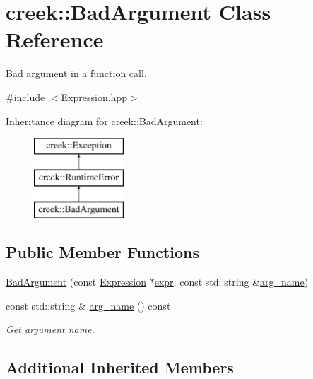 \hypertarget{classcreek_1_1_bad_argument}{}\section{creek\+:\+:Bad\+Argument Class Reference}
\label{classcreek_1_1_bad_argument}


Bad argument in a function call.  




{\ttfamily \#include $<$Expression.\+hpp$>$}

Inheritance diagram for creek\+:\+:Bad\+Argument\+:\begin{figure}[H]
\begin{center}
\leavevmode
\includegraphics[height=3.000000cm]{classcreek_1_1_bad_argument}
\end{center}
\end{figure}
\subsection*{Public Member Functions}
\begin{DoxyCompactItemize}
\item 
\hyperlink{classcreek_1_1_bad_argument_a2d8ffaa3a70390d4d1e4fafa25ccf750}{Bad\+Argument} (const \hyperlink{classcreek_1_1_expression}{Expression} $\ast$\hyperlink{classcreek_1_1_runtime_error_a30ca1c364ada5b9a9fb37d1bc831db89}{expr}, const std\+::string \&\hyperlink{classcreek_1_1_bad_argument_a9c3bb1e7bc5005d44631a170b125485c}{arg\+\_\+name})
\item 
const std\+::string \& \hyperlink{classcreek_1_1_bad_argument_a9c3bb1e7bc5005d44631a170b125485c}{arg\+\_\+name} () const \hypertarget{classcreek_1_1_bad_argument_a9c3bb1e7bc5005d44631a170b125485c}{}\label{classcreek_1_1_bad_argument_a9c3bb1e7bc5005d44631a170b125485c}

\begin{DoxyCompactList}\small\item\em Get argument name. \end{DoxyCompactList}\end{DoxyCompactItemize}
\subsection*{Additional Inherited Members}


